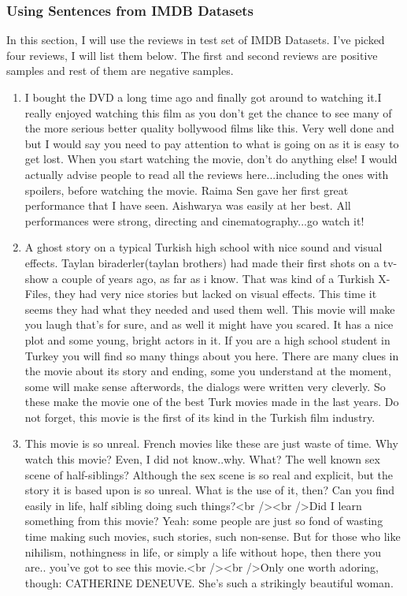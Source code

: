 \documentclass{article}[12pt]
\begin{document}
\subsubsection{Using Sentences from IMDB Datasets}

In this section, I will use the reviews in test set of IMDB Datasets. I've picked four reviews, I will list them below. The first and second reviews are positive samples and rest of them are negative samples.

\begin{enumerate}
	\footnotesize
	\item I bought the DVD a long time ago and finally got around to watching it.I really enjoyed watching this film as you don't get the chance to see many of the more serious better quality bollywood films like this. Very well done and but I would say you need to pay attention to what is going on as it is easy to get lost. When you start watching the movie, don't do anything else! I would actually advise people to read all the reviews here...including the ones with spoilers, before watching the movie. Raima Sen gave her first great performance that I have seen. Aishwarya was easily at her best. All performances were strong, directing and cinematography...go watch it!
	\item A ghost story on a typical Turkish high school with nice sound and visual effects. Taylan biraderler(taylan brothers) had made their first shots on a tv-show a couple of years ago, as far as i know. That was kind of a Turkish X-Files, they had very nice stories but lacked on visual effects. This time it seems they had what they needed and used them well. This movie will make you laugh that's for sure, and as well it might have you scared. It has a nice plot and some young, bright actors in it. If you are a high school student in Turkey you will find so many things about you here. There are many clues in the movie about its story and ending, some you understand at the moment, some will make sense afterwords, the dialogs were written very cleverly. So these make the movie one of the best Turk movies made in the last years. Do not forget, this movie is the first of its kind in the Turkish film industry.
	\item This movie is so unreal. French movies like these are just waste of time. Why watch this movie? Even, I did not know..why. What? The well known sex scene of half-siblings? Although the sex scene is so real and explicit, but the story it is based upon is so unreal. What is the use of it, then? Can you find easily in life, half sibling doing such things?<br /><br />Did I learn something from this movie? Yeah: some people are just so fond of wasting time making such movies, such stories, such non-sense. But for those who like nihilism, nothingness in life, or simply a life without hope, then there you are.. you've got to see this movie.<br /><br />Only one worth adoring, though: CATHERINE DENEUVE. She's such a strikingly beautiful woman.

\end{enumerate}
\end{document}
